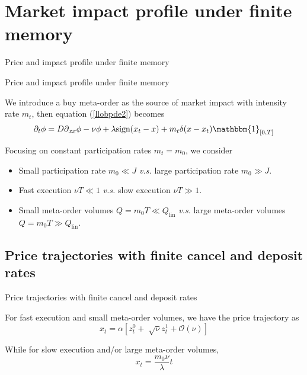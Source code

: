\documentclass{beamer}
\begin{document}
\section{Market impact profile under finite memory}

\begin{frame}{Price and impact profile under finite memory}
  \tableofcontents[currentsection]
\end{frame}

\begin{frame}{Price and impact profile under finite memory}

We introduce a buy meta-order as the source of market impact with intensity rate $m_t$, then equation (\ref{llobpde2}) becomes
\begin{equation}\label{llobpde3}
\partial_t\phi = D\partial_{xx}\phi-\nu\phi+\lambda\text{sign}(x_t-x)+m_t\delta(x-x_t)\mathbbm{1}_{[0,T]}
\end{equation}

Focusing on constant participation rates $m_t=m_0$, we consider

\begin{itemize}
\item Small participation rate $m_0\ll J$ \textit{v.s.} large participation rate $m_0\gg J$.
\item Fast execution $\nu T\ll 1$ \textit{v.s.} slow execution $\nu T\gg 1$.
\item Small meta-order volumes $Q=m_0 T\ll Q_\text{lin}$ \textit{v.s.} large meta-order volumes $Q=m_0 T\gg Q_\text{lin}$.
\end{itemize}

\end{frame}

\subsection{Price trajectories with finite cancel and deposit rates}

\begin{frame}{Price trajectories with finite cancel and deposit rates}

For fast execution and small meta-order volumes, we have the price trajectory as
\begin{equation}
x_t=\alpha\left[z_t^0+\sqrt[]{\nu}z_t^1+\mathcal{O}(\nu)\right]
\end{equation}

While for slow execution and/or large meta-order volumes,
\begin{equation}
x_t=\frac{m_0\nu}{\lambda}t
\end{equation}

\end{frame}
\end{document}
